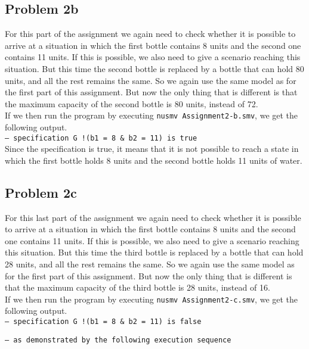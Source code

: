 \documentclass[a4paper]{article}
\begin{document}
{	\subsection*{Problem 2b}
	For this part of the assignment we again need to check whether it is possible to arrive at a situation in which the first bottle contains 8 units and the second one contains 11 units. If this is possible, we also need to give a scenario reaching this situation. But this time the second bottle is replaced by a bottle that can hold 80 units, and all the rest remains the same. So we again use the same model as for the first part of this assignment. But now the only thing that is different is that the maximum capacity of the second bottle is 80 units, instead of 72.\\
	
	If we then run the program by executing {\tt nusmv Assignment2-b.smv}, we get the following output.\\
	
{\tt -- specification  G !(b1 = 8 \& b2 = 11)  is true}\\

Since the specification is true, it means that it is not possible to reach a state in which the first bottle holds 8 units and the second bottle holds 11 units of water.

	\subsection*{Problem 2c}
	For this last part of the assignment we again need to check whether it is possible to arrive at a situation in which the first bottle contains 8 units and the second one contains 11 units. If this is possible, we also need to give a scenario reaching this situation. But this time the third bottle is replaced by a bottle that can hold 28 units, and all the rest remains the same. So we again use the same model as for the first part of this assignment. But now the only thing that is different is that the maximum capacity of the third bottle is 28 units, instead of 16.\\
	
	If we then run the program by executing {\tt nusmv Assignment2-c.smv}, we get the following output.\\

{\tt -- specification  G !(b1 = 8 \& b2 = 11)  is false }

{\tt -- as demonstrated by the following execution sequence }

}
\end{document}
